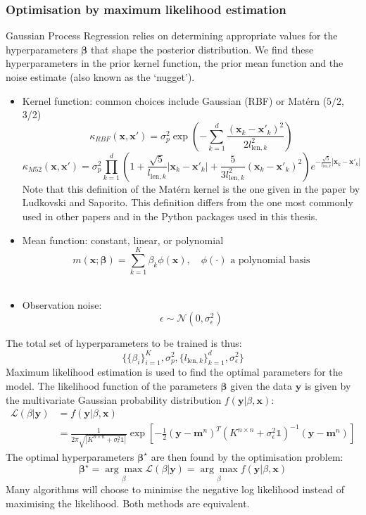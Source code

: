 \documentclass[a4paper,12pt]{article}
\begin{document}
\subsubsection{Optimisation by maximum likelihood estimation}
Gaussian Process Regression relies on determining appropriate values for the hyperparameters $\boldsymbol{\beta}$ that shape the posterior distribution. We find these hyperparameters in the prior kernel function, the prior mean function and the noise estimate (also known as the `nugget'). 
\begin{itemize}
    \item Kernel function: common choices include Gaussian (RBF) or Matérn ($5/2$, 3/2)
    $$ \kappa_{RBF}(\mathbf{x},\mathbf{x}')  = \sigma^2_p \exp{\left (-\sum_{k=1}^d\frac{(\mathbf{x}_k-\mathbf{x}'_k)^2}{2l_{\text{len},k}^2}\right )}$$
    $$
    \kappa_{M52}(\mathbf{x},\mathbf{x}') =\sigma_p^2 \prod_{k=1}^d \left(1+\frac{\sqrt{5}}{l_{\text{len},k}}|\mathbf{x}_k-\mathbf{x}'_k| +\frac{5}{3l^2_{\text{len},k}}(\mathbf{x}_k-\mathbf{x}'_k)^2 \right)e^{-\frac{\sqrt{5}}{l_{\text{len},k}}|\mathbf{x}_k-\mathbf{x}'_k|}
    $$
    Note that this definition of the Matérn kernel is the one given in the paper \cite{Ludkovski2020} by Ludkovski and Saporito. This definition differs from the one most commonly used in other papers and in the Python packages used in this thesis.\\
    \item Mean function: constant, linear, or polynomial 
    $$ m(\mathbf{x};\boldsymbol{\beta}) = \sum_{k=1}^K \beta_k\phi(\mathbf{x}), \quad \phi(\cdot) \text{ a polynomial basis} $$\\
    \item Observation noise: $$\epsilon \sim \mathcal{N}(0,\sigma^2_{\epsilon}) $$
\end{itemize}
The total set of hyperparameters to be trained is thus:
$$  \{\{\beta_i \}_{i=1}^K, \sigma^2_p,\{l_{\text{len},k} \}_{k=1}^d ,\sigma^2_{\epsilon}\} $$
Maximum likelihood estimation is used to find the optimal parameters for the model. The likelihood function of the parameters $\mathbf{\beta}$ given the data $\mathbf{y}$ is given by the multivariate Gaussian probability distribution $f(\mathbf{y} | \beta, \mathbf{x})$:
\begin{align*}
    \mathcal{L}(\beta | \mathbf{y}) &= f(\mathbf{y} | \beta, \mathbf{x})\\
    &= \frac{1}{2 \pi \sqrt{|K^{n \times n} + \sigma_\epsilon^2 \mathbb{1}|}} \exp [-\frac{1}{2}(\mathbf{y} - \mathbf{m}^n)^T(K^{n \times n} + \sigma_\epsilon^2 \mathbb{1})^{-1}(\mathbf{y} - \mathbf{m}^n)]
\end{align*}
The optimal hyperparameters $\mathbf{\beta}^\star$ are then found by the optimisation problem:
\begin{equation}
    \mathbf{\beta}^\star = \underset{\beta}{\arg\max} \mathcal{L}(\beta | \mathbf{y}) = \underset{\beta}{\arg\max} f(\mathbf{y} | \beta, \mathbf{x})
\end{equation}
Many algorithms will choose to minimise the negative log likelihood instead of maximising the likelihood. Both methods are equivalent.
\end{document}
